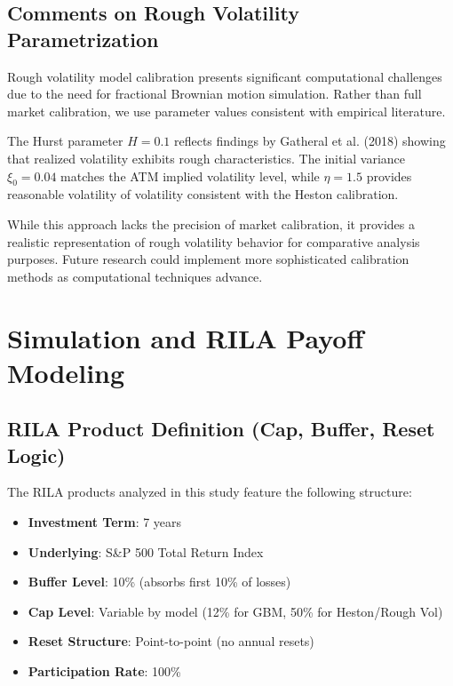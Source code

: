 \documentclass[12pt,a4paper]{report}
\begin{document}

\section{Comments on Rough Volatility Parametrization}

Rough volatility model calibration presents significant computational challenges due to the need for fractional Brownian motion simulation. Rather than full market calibration, we use parameter values consistent with empirical literature.

The Hurst parameter $H = 0.1$ reflects findings by Gatheral et al. (2018) showing that realized volatility exhibits rough characteristics. The initial variance $\xi_0 = 0.04$ matches the ATM implied volatility level, while $\eta = 1.5$ provides reasonable volatility of volatility consistent with the Heston calibration.

While this approach lacks the precision of market calibration, it provides a realistic representation of rough volatility behavior for comparative analysis purposes. Future research could implement more sophisticated calibration methods as computational techniques advance.

\chapter{Simulation and RILA Payoff Modeling}

\section{RILA Product Definition (Cap, Buffer, Reset Logic)}

The RILA products analyzed in this study feature the following structure:
\begin{itemize}
\item \textbf{Investment Term}: 7 years
\item \textbf{Underlying}: S\&P 500 Total Return Index
\item \textbf{Buffer Level}: 10\% (absorbs first 10\% of losses)
\item \textbf{Cap Level}: Variable by model (12\% for GBM, 50\% for Heston/Rough Vol)
\item \textbf{Reset Structure}: Point-to-point (no annual resets)
\item \textbf{Participation Rate}: 100\%
\end{itemize}
\end{document}
